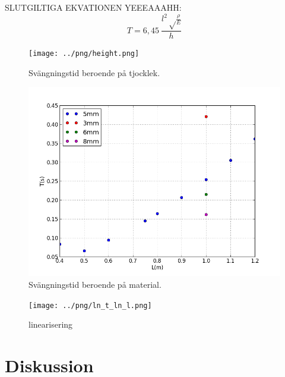 \documentclass[10pt, titlepage, oneside, a4paper]{article}
\begin{document}
\vspace{10pt}
SLUTGILTIGA EKVATIONEN YEEEAAAHH:
\begin{equation}
T = 6,45\ \frac{l^2\sqrt\frac{\rho}{E}}{h}
\end{equation}

        
            
                    
    \begin{figure}[H]
        \centering
        \texttt{[image: ../png/height.png]}
        \caption{Svängningstid beroende på tjocklek.}
        \label{height}
    \end{figure}
    \begin{figure}[H]
        \centering
        \includegraphics[scale=.5]{../png/plot.png}
        \caption{Svängningstid beroende på material.}
        \label{material}
    \end{figure}
    \begin{figure}[H]
        \centering
        \texttt{[image: ../png/ln\_t\_ln\_l.png]}
        \caption{linearisering}
        \label{linearisering}
    \end{figure}



    \section{Diskussion}
\end{document}
